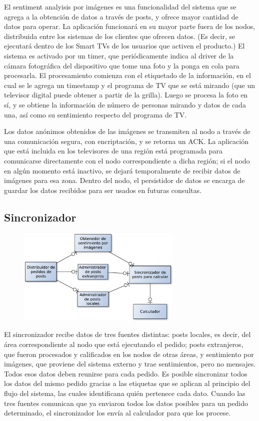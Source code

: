 El sentiment analyisis por imágenes es una funcionalidad del sistema que se agrega a la obtención de datos a través de posts, y ofrece mayor cantidad de datos para operar. La aplicación funcionará en su mayor parte fuera de los nodos, distribuida entre los sistemas de los clientes que ofrecen datos. (Es decir, se ejecutará dentro de los Smart TVs de los usuarios que activen el producto.) El sistema es activado por un timer, que periódicamente indica al driver de la cámara fotográfica del dispositivo que tome una foto y la ponga en cola para procesarla. El procesamiento comienza con el etiquetado de la información, en el cual se le agrega un timestamp y el programa de TV que se está mirando (que un televisor digital puede obtener a partir de la grilla). Luego se procesa la foto en sí, y se obtiene la información de número de personas mirando y datos de cada una, así como su sentimiento respecto del programa de TV.

Los datos anónimos obtenidos de las imágenes se transmiten al nodo a través de una comunicación segura, con encriptación, y se retorna un ACK. La aplicación que está incluida en los televisores de una región está programada para comunicarse directamente con el nodo correspondiente a dicha región; si el nodo en algún momento está inactivo, se dejará temporalmente de recibir datos de imágenes para esa zona. Dentro del nodo, el persistidor de datos se encarga de guardar los datos recibidos para ser usados en futuras consultas.

\subsection{Sincronizador}

\begin{figure}[H]
\centering
\includegraphics[width=0.7\textwidth]{graph/sincro.pdf}
\end{figure}

El sincronizador recibe datos de tres fuentes distintas: posts locales, es decir, del área correspondiente al nodo que está ejecutando el pedido; posts extranjeros, que fueron procesados y calificados en los nodos de otras áreas, y sentimiento por imágenes, que proviene del sistema externo y trae sentimientos, pero no mensajes. Todos esos datos deben reunirse para cada pedido. Es posible sincronizar todos los datos del mismo pedido gracias a las etiquetas que se aplican al principio del flujo del sistema, las cuales identificana quién pertenece cada dato. Cuando las tres fuentes comunican que ya enviaron todos los datos posibles para un pedido determinado, el sincronizador los envía al calculador para que los procese.

